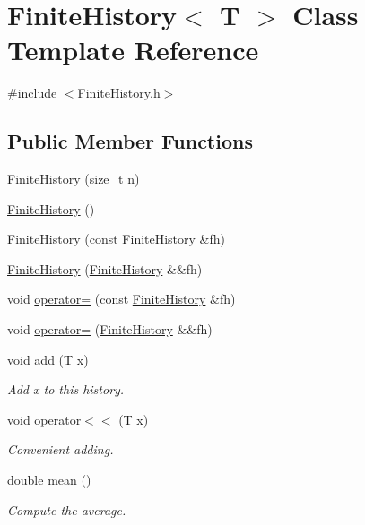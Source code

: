 \hypertarget{class_finite_history}{}\section{Finite\+History$<$ T $>$ Class Template Reference}
\label{class_finite_history}


{\ttfamily \#include $<$Finite\+History.\+h$>$}

\subsection*{Public Member Functions}
\begin{DoxyCompactItemize}
\item 
\hyperlink{class_finite_history_a9300fde1231d7307a97349caa4745b1a}{Finite\+History} (size\+\_\+t n)
\item 
\hyperlink{class_finite_history_a845a1fd7ec4b850c2ee6ec2003c6bd3e}{Finite\+History} ()
\item 
\hyperlink{class_finite_history_a601fa98e570953c9d0e9a562a24b92c1}{Finite\+History} (const \hyperlink{class_finite_history}{Finite\+History} \&fh)
\item 
\hyperlink{class_finite_history_ade3eff280584fefaf796c70912781825}{Finite\+History} (\hyperlink{class_finite_history}{Finite\+History} \&\&fh)
\item 
void \hyperlink{class_finite_history_afdc27d66ff1c1c386185f29eff5c474c}{operator=} (const \hyperlink{class_finite_history}{Finite\+History} \&fh)
\item 
void \hyperlink{class_finite_history_a1c3695b639cd2ec5cda375c4450b3cc8}{operator=} (\hyperlink{class_finite_history}{Finite\+History} \&\&fh)
\item 
void \hyperlink{class_finite_history_ae7e85a666c78b8d21276758ac1c2f22f}{add} (T x)
\begin{DoxyCompactList}\small\item\em Add x to this history. \end{DoxyCompactList}\item 
void \hyperlink{class_finite_history_aec85dc2f48062985164e4033223d9312}{operator$<$$<$} (T x)
\begin{DoxyCompactList}\small\item\em Convenient adding. \end{DoxyCompactList}\item 
double \hyperlink{class_finite_history_a1184d6b1d30c2d4d86846a643dbee18a}{mean} ()
\begin{DoxyCompactList}\small\item\em Compute the average. \end{DoxyCompactList}\end{DoxyCompactItemize}
